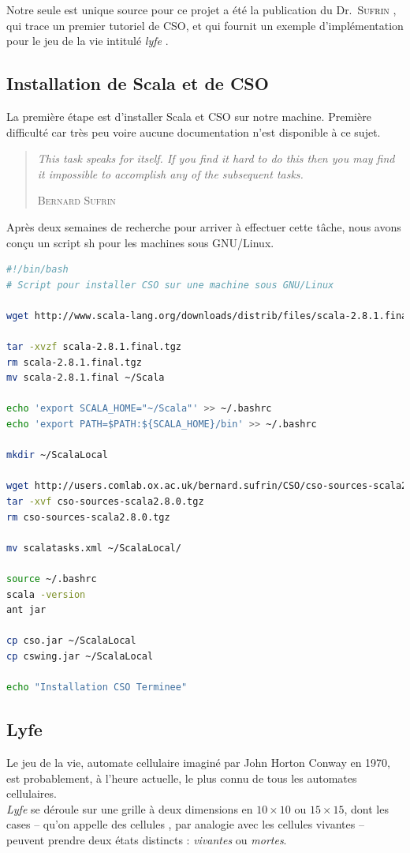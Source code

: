 \documentclass[a4paper,11pt,french]{report}
\begin{document}
Notre seule est unique source pour ce projet a été la publication du Dr.\ \textsc{Sufrin} \cite{cpa2008-cso}, qui trace un premier tutoriel de CSO, et qui fournit un exemple d'implémentation pour le jeu de la vie intitulé \og \emph{lyfe} \fg.\\

\subsection{Installation de Scala et de CSO}

La première étape est d'installer Scala et CSO sur notre machine. Première difficulté car très peu voire aucune documentation n'est disponible à ce sujet. 

\begin{quotation}
\textit{\og This task speaks for itself. If you find it hard to do this then you may find it impossible
to accomplish any of the subsequent tasks.\fg}
\begin{flushright}
\textsc{Bernard Sufrin}
\end{flushright}
\end{quotation}
Après deux semaines de recherche pour arriver à effectuer cette tâche, nous avons conçu un script \textsf{sh} pour les machines sous GNU/Linux.\\

\begin{lstlisting}[frame=trBL, language=bash, title={install\_{}cso.sh}]
#!/bin/bash
# Script pour installer CSO sur une machine sous GNU/Linux

wget http://www.scala-lang.org/downloads/distrib/files/scala-2.8.1.final.tgz

tar -xvzf scala-2.8.1.final.tgz
rm scala-2.8.1.final.tgz
mv scala-2.8.1.final ~/Scala

echo 'export SCALA_HOME="~/Scala"' >> ~/.bashrc
echo 'export PATH=$PATH:${SCALA_HOME}/bin' >> ~/.bashrc

mkdir ~/ScalaLocal

wget http://users.comlab.ox.ac.uk/bernard.sufrin/CSO/cso-sources-scala2.8.0.tgz
tar -xvf cso-sources-scala2.8.0.tgz
rm cso-sources-scala2.8.0.tgz

mv scalatasks.xml ~/ScalaLocal/

source ~/.bashrc
scala -version
ant jar

cp cso.jar ~/ScalaLocal
cp cswing.jar ~/ScalaLocal

echo "Installation CSO Terminee"
\end{lstlisting}
\subsection{Lyfe}
Le jeu de la vie, automate cellulaire imaginé par John Horton Conway en 1970, est probablement, à l’heure actuelle, le plus connu de tous les automates cellulaires.\\
\emph{Lyfe} se déroule sur une grille à deux dimensions en $10\times 10$ ou $15\times 15$, dont les cases -- qu’on appelle des \og cellules \fg, par analogie avec les cellules vivantes -- peuvent prendre deux états distincts : \emph{vivantes} ou \emph{mortes}.\\
\end{document}
